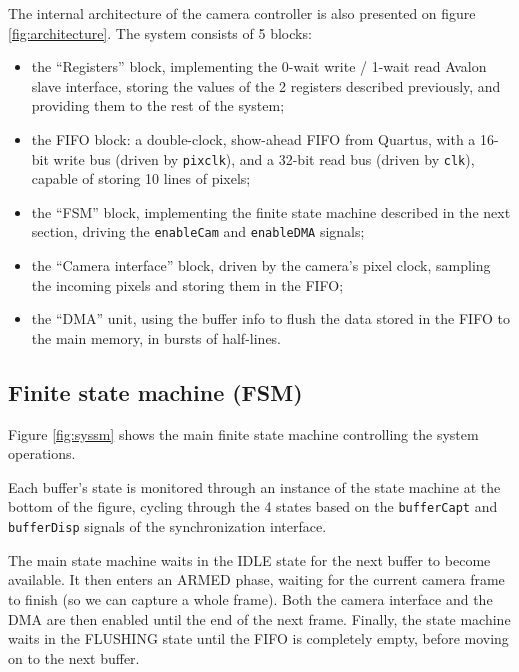 \documentclass[12pt,a4paper]{article}
\begin{document}
The internal architecture of the camera controller is also presented on figure \ref{fig:architecture}. The system consists of 5 blocks:
\begin{itemize}
	\item the ``Registers'' block, implementing the 0-wait write / 1-wait read Avalon slave interface, storing the values of the 2 registers described previously, and providing them to the rest of the system;
	\item the FIFO block: a double-clock, show-ahead FIFO from Quartus, with a 16-bit write bus (driven by \texttt{pixclk}), and a 32-bit read bus (driven by \texttt{clk}), capable of storing 10 lines of pixels;
	\item the ``FSM'' block, implementing the finite state machine described in the next section, driving the \texttt{enableCam} and \texttt{enableDMA} signals;
	\item the ``Camera interface'' block, driven by the camera's pixel clock, sampling the incoming pixels and storing them in the FIFO;
	\item the ``DMA'' unit, using the buffer info to flush the data stored in the FIFO to the main memory, in bursts of half-lines.
\end{itemize}


\subsection{Finite state machine (FSM)}

Figure \ref{fig:syssm} shows the main finite state machine controlling the system operations. 

Each buffer's state is monitored through an instance of the state machine at the bottom of the figure, cycling through the 4 states based on the \texttt{bufferCapt} and \texttt{bufferDisp} signals of the synchronization interface.

The main state machine waits in the IDLE state for the next buffer to become available. It then enters an ARMED phase, waiting for the current camera frame to finish (so we can capture a whole frame). Both the camera interface and the DMA are then enabled until the end of the next frame. Finally, the state machine waits in the FLUSHING state until the FIFO is completely empty, before moving on to the next buffer.
\end{document}
